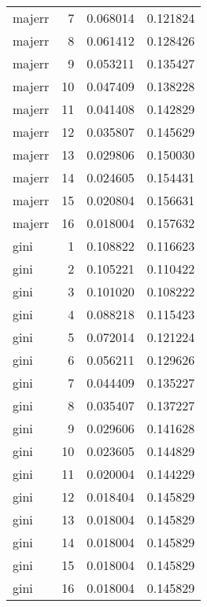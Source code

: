\begin{longtable}{lrrr}
  majerr &          7 &     0.068014 &    0.121824 \\
  majerr &          8 &     0.061412 &    0.128426 \\
  majerr &          9 &     0.053211 &    0.135427 \\
  majerr &         10 &     0.047409 &    0.138228 \\
  majerr &         11 &     0.041408 &    0.142829 \\
  majerr &         12 &     0.035807 &    0.145629 \\
  majerr &         13 &     0.029806 &    0.150030 \\
  majerr &         14 &     0.024605 &    0.154431 \\
  majerr &         15 &     0.020804 &    0.156631 \\
  majerr &         16 &     0.018004 &    0.157632 \\
    gini &          1 &     0.108822 &    0.116623 \\
    gini &          2 &     0.105221 &    0.110422 \\
    gini &          3 &     0.101020 &    0.108222 \\
    gini &          4 &     0.088218 &    0.115423 \\
    gini &          5 &     0.072014 &    0.121224 \\
    gini &          6 &     0.056211 &    0.129626 \\
    gini &          7 &     0.044409 &    0.135227 \\
    gini &          8 &     0.035407 &    0.137227 \\
    gini &          9 &     0.029606 &    0.141628 \\
    gini &         10 &     0.023605 &    0.144829 \\
    gini &         11 &     0.020004 &    0.144229 \\
    gini &         12 &     0.018404 &    0.145829 \\
    gini &         13 &     0.018004 &    0.145829 \\
    gini &         14 &     0.018004 &    0.145829 \\
    gini &         15 &     0.018004 &    0.145829 \\
    gini &         16 &     0.018004 &    0.145829 \\
\end{longtable}
